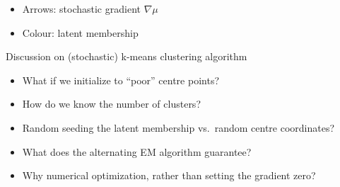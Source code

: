 \documentclass[
  ignorenonframetext,
  aspectratio=169]{beamer}
\begin{document}
\begin{frame}{}
\scriptsize


\normalsize

\scriptsize


\normalsize

\scriptsize


\normalsize

\scriptsize


\normalsize

\scriptsize


\normalsize

\begin{itemize}
\item
  Arrows: stochastic gradient \(\nabla \mu\)
\item
  Colour: latent membership
\end{itemize}
\end{frame}

\begin{frame}{Discussion on (stochastic) k-means clustering algorithm}
\protect\hypertarget{discussion-on-stochastic-k-means-clustering-algorithm}{}
\begin{itemize}
\item
  What if we initialize to ``poor'' centre points?
\item
  How do we know the number of clusters?
\item
  Random seeding the latent membership vs.~random centre coordinates?
\item
  What does the alternating EM algorithm guarantee?
\item
  Why numerical optimization, rather than setting the gradient zero?
\end{itemize}
\end{frame}
\end{document}
